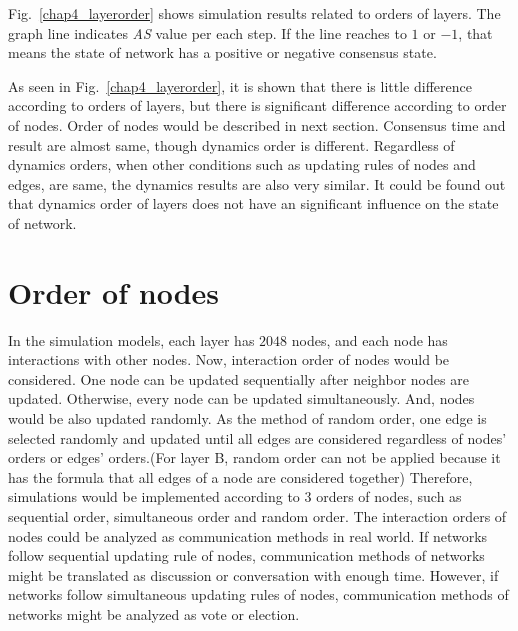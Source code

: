Fig.~\ref{chap4_layerorder} shows simulation results related to orders of layers. The graph line indicates \textit{AS} value per each step. If the line reaches to $1$ or $-1$, that means the state of network has a positive or negative consensus state.

As seen in Fig.~\ref{chap4_layerorder}, it is shown that there is little difference according to orders of layers, but there is significant difference according to order of nodes. Order of nodes would be described in next section. Consensus time and result are almost same, though dynamics order is different. Regardless of dynamics orders, when other conditions such as updating rules of nodes and edges, are same, the dynamics results are also very similar. It could be found out that dynamics order of layers does not have an significant influence on the state of network. \\

\section{Order of nodes}
In the simulation models, each layer has $2048$ nodes, and each node has interactions with other nodes. Now, interaction order of nodes would be considered. One node can be updated sequentially after neighbor nodes are updated. Otherwise, every node can be updated simultaneously. And, nodes would be also updated randomly. As the method of random order, one edge is selected randomly and updated until all edges are considered regardless of nodes' orders or edges' orders.(For layer B, random order can not be applied because it has the formula that all edges of a node are considered together) Therefore, simulations would be implemented according to $3$ orders of nodes, such as sequential order, simultaneous order and random order. The interaction orders of nodes could be analyzed as communication methods in real world. If networks follow sequential updating rule of nodes, communication methods of networks might be translated as discussion or conversation with enough time. However, if networks follow simultaneous updating rules of nodes, communication methods of networks might be analyzed as vote or election.

